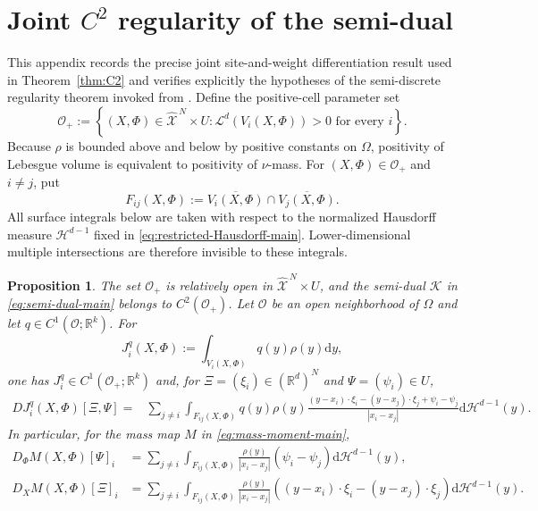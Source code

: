 \documentclass[11pt]{article}
\def\R{\mathbb{R}}
\def\Oc{{\mathcal O}}
\def\Xc{{\mathcal X}}
\def\hX{\widehat{\Xc}^{\,N}}
\newcommand{\dd}{\mathrm{d}}
\newcommand{\Leb}{\mathcal L}
\newcommand{\HH}{\mathcal H}
\newcommand{\Kant}{\mathscr K}
\newtheorem{proposition}[theorem]{Proposition}
\theoremstyle{definition}
\theoremstyle{remark}
\numberwithin{equation}{section}
\begin{document}
\appendix

\section{Joint \texorpdfstring{$C^2$}{C2} regularity of the semi-dual}
\label{app:parametric}

This appendix records the precise joint site-and-weight differentiation result used in
Theorem~\ref{thm:C2} and verifies explicitly the hypotheses of the semi-discrete regularity theorem
invoked from \cite{deGournayKahnLebrat2019}.  Define the positive-cell parameter set
\begin{equation}\label{eq:positive-cell-set}
 \Oc_+:=\left\{(X,\Phi)\in\hX\times U:
 \Leb^d(V_i(X,\Phi))>0\text{ for every }i\right\}.
\end{equation}
Because $\rho$ is bounded above and below by positive constants on $\Omega$, positivity of
Lebesgue volume is equivalent to positivity of $\nu$-mass.  For $(X,\Phi)\in\Oc_+$ and $i\ne j$,
put
\begin{equation}\label{eq:general-facets-app}
 F_{ij}(X,\Phi):=\overline{V_i(X,\Phi)}\cap\overline{V_j(X,\Phi)}.
\end{equation}
All surface integrals below are taken with respect to the normalized Hausdorff measure
$\HH^{d-1}$ fixed in \eqref{eq:restricted-Hausdorff-main}.  Lower-dimensional multiple
intersections are therefore invisible to these integrals.

\begin{proposition}\label{prop:joint-C2-semidual}
The set $\Oc_+$ is relatively open in $\hX\times U$, and the semi-dual $\Kant$ in
\eqref{eq:semi-dual-main} belongs to $C^2(\Oc_+)$.  Let $\Oc$ be an open neighborhood of
$\Omega$ and let $q\in C^1(\Oc;\R^k)$.  For
\begin{equation}\label{eq:Jq-app}
 J_i^q(X,\Phi):=\int_{V_i(X,\Phi)}q(y)\rho(y)\dd y,
\end{equation}
one has $J_i^q\in C^1(\Oc_+;\R^k)$ and, for
$\Xi=(\xi_i)\in(\R^d)^N$ and $\Psi=(\psi_i)\in U$,
\begin{align}
 DJ_i^q(X,\Phi)[\Xi,\Psi]
 ={}&\sum_{j\ne i}\int_{F_{ij}(X,\Phi)}
 q(y)\rho(y)
 \frac{(y-x_i)\cdot\xi_i-(y-x_j)\cdot\xi_j+
 \psi_i-\psi_j}{|x_i-x_j|}
 \dd\HH^{d-1}(y).
 \label{eq:moving-cell-app}
\end{align}
In particular, for the mass map $M$ in \eqref{eq:mass-moment-main},
\begin{align}
 D_\Phi M(X,\Phi)[\Psi]_i
 &=\sum_{j\ne i}\int_{F_{ij}(X,\Phi)}
 \frac{\rho(y)}{|x_i-x_j|}(\psi_i-\psi_j)\dd\HH^{d-1}(y),
 \label{eq:DphiM-app}\\
 D_XM(X,\Phi)[\Xi]_i
 &=\sum_{j\ne i}\int_{F_{ij}(X,\Phi)}
 \frac{\rho(y)}{|x_i-x_j|}
 \left((y-x_i)\cdot\xi_i-(y-x_j)\cdot\xi_j\right)
 \dd\HH^{d-1}(y).
 \label{eq:DXM-app}
\end{align}
\end{proposition}
\end{document}
